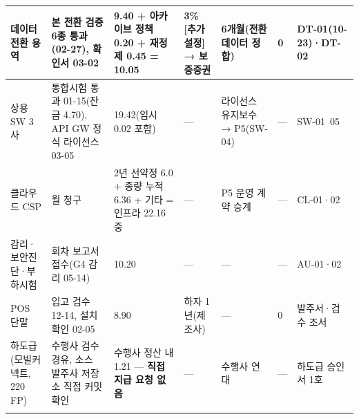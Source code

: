 \documentclass[10pt,a4paper]{article}
\begin{document}
{\begin{tabularx}{\linewidth}{|L{22mm}|L{30mm}|L{52mm}|L{30mm}|L{44mm}|Y|L{26mm}|}
데이터 전환 용역 & 본 전환 검증 6종 통과(02-27), 확인서 03-02 & 9.40 + 아카이브 정책 0.20 + 재정제 0.45 = 10.05 & 3\% [추가 설정] → 보증증권 & 6개월(전환 데이터 정합) & 0 & DT-01(10-23)·DT-02 \\ \hline
상용SW 3사 & 통합시험 통과 01-15(잔금 4.70), API GW 정식 라이선스 03-05 & 19.42(임시 0.02 포함) & — & 라이선스 유지보수 → P5(SW-04) & — & SW-01~05 \\ \hline
클라우드 CSP & 월 청구 & 2년 선약정 6.0 + 종량 누적 6.36 + 기타 = 인프라 22.16 중 & — & P5 운영 계약 승계 & — & CL-01·02 \\ \hline
감리·보안진단·부하시험 & 회차 보고서 접수(G4 감리 05-14) & 10.20 & — & — & — & AU-01·02 \\ \hline
POS 단말 & 입고 검수 12-14, 설치 확인 02-05 & 8.90 & 하자 1년(제조사) & — & 0 & 발주서·검수 조서 \\ \hline
하도급(모빌커넥트, 220 FP) & 수행사 검수 경유, 소스 발주사 저장소 직접 커밋 확인 & 수행사 정산 내 1.21 — \textbf{직접 지급 요청 없음} & — & 수행사 연대 & — & 하도급 승인서 1호 \\ \hline
\fi
\end{tabularx}}
\landscapeoff
\end{document}
